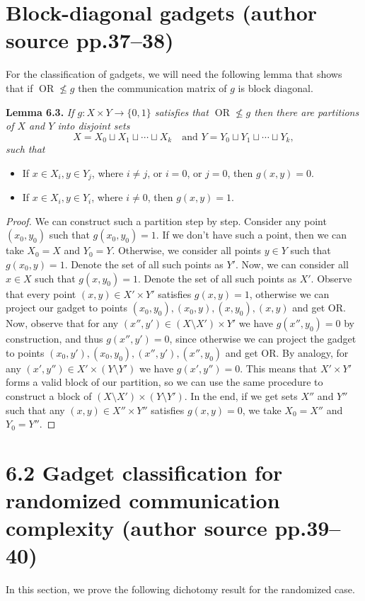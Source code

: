 \documentclass[10pt,a4paper]{article}
\newcommand{\bits}{\{0,1\}}
\newcommand{\OR}{\operatorname{OR}}
\newenvironment{originalresult}[1]{\par\medskip\noindent\textbf{#1.}\itshape}{\par\medskip}
\begin{document}
\section*{Block-diagonal gadgets (author source pp.37--38)}
For the classification of gadgets, we will need the following lemma that shows that if $\OR\nleq g$ then the communication matrix of $g$ is block diagonal.
\begin{originalresult}{Lemma 6.3}
If $g:X\times Y\to\bits$ satisfies that $\OR\nleq g$ then there are partitions of $X$ and $Y$ into disjoint sets
\[X=X_0\sqcup X_1\sqcup\cdots\sqcup X_k\quad\text{and }Y=Y_0\sqcup Y_1\sqcup\cdots\sqcup Y_k,\]
such that
\begin{itemize}
\item If $x\in X_i,y\in Y_j$, where $i\ne j$, or $i=0$, or $j=0$, then $g(x,y)=0$.
\item If $x\in X_i,y\in Y_i$, where $i\ne0$, then $g(x,y)=1$.
\end{itemize}
\end{originalresult}
\begin{proof}
We can construct such a partition step by step. Consider any point $(x_0,y_0)$ such that $g(x_0,y_0)=1$. If we don't have such a point, then we can take $X_0=X$ and $Y_0=Y$. Otherwise, we consider all points $y\in Y$ such that $g(x_0,y)=1$. Denote the set of all such points as $Y'$. Now, we can consider all $x\in X$ such that $g(x,y_0)=1$. Denote the set of all such points as $X'$. Observe that every point $(x,y)\in X'\times Y'$ satisfies $g(x,y)=1$, otherwise we can project our gadget to points $(x_0,y_0),(x_0,y),(x,y_0),(x,y)$ and get OR.
Now, observe that for any $(x'',y')\in(X\setminus X')\times Y'$ we have $g(x'',y_0)=0$ by construction, and thus $g(x'',y')=0$, since otherwise we can project the gadget to points $(x_0,y'),(x_0,y_0),(x'',y'),(x'',y_0)$ and get OR. By analogy, for any $(x',y'')\in X'\times(Y\setminus Y')$ we have $g(x',y'')=0$.
This means that $X'\times Y'$ forms a valid block of our partition, so we can use the same procedure to construct a block of $(X\setminus X')\times(Y\setminus Y')$. In the end, if we get sets $X''$ and $Y''$ such that any $(x,y)\in X''\times Y''$ satisfies $g(x,y)=0$, we take $X_0=X''$ and $Y_0=Y''$.
\end{proof}

\section*{6.2 Gadget classification for randomized communication complexity (author source pp.39--40)}
In this section, we prove the following dichotomy result for the randomized case.
\end{document}
